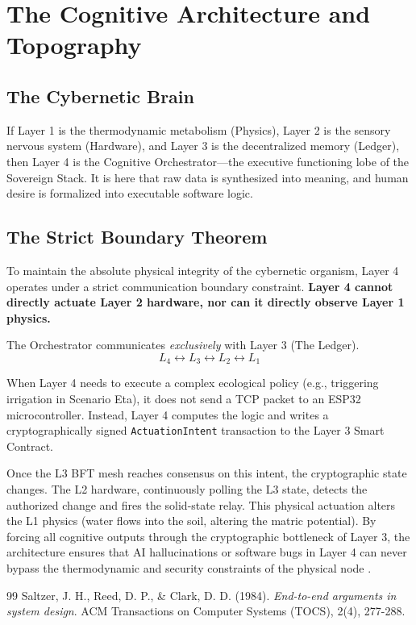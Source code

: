 \chapter{The Cognitive Architecture and Topography}

\section{The Cybernetic Brain}
If Layer 1 is the thermodynamic metabolism (Physics), Layer 2 is the sensory nervous system (Hardware), and Layer 3 is the decentralized memory (Ledger), then Layer 4 is the Cognitive Orchestrator—the executive functioning lobe of the Sovereign Stack. It is here that raw data is synthesized into meaning, and human desire is formalized into executable software logic.

\section{The Strict Boundary Theorem}
To maintain the absolute physical integrity of the cybernetic organism, Layer 4 operates under a strict communication boundary constraint. \textbf{Layer 4 cannot directly actuate Layer 2 hardware, nor can it directly observe Layer 1 physics.} 

The Orchestrator communicates \textit{exclusively} with Layer 3 (The Ledger). 
\begin{equation}
L_4 \leftrightarrow L_3 \leftrightarrow L_2 \leftrightarrow L_1
\end{equation}

When Layer 4 needs to execute a complex ecological policy (e.g., triggering irrigation in Scenario Eta), it does not send a TCP packet to an ESP32 microcontroller. Instead, Layer 4 computes the logic and writes a cryptographically signed \texttt{ActuationIntent} transaction to the Layer 3 Smart Contract. 

Once the L3 BFT mesh reaches consensus on this intent, the cryptographic state changes. The L2 hardware, continuously polling the L3 state, detects the authorized change and fires the solid-state relay. This physical actuation alters the L1 physics (water flows into the soil, altering the matric potential). By forcing all cognitive outputs through the cryptographic bottleneck of Layer 3, the architecture ensures that AI hallucinations or software bugs in Layer 4 can never bypass the thermodynamic and security constraints of the physical node \cite{saltzer1984end}.

\vspace{1cm}
\begin{thebibliography}{99}
Saltzer, J. H., Reed, D. P., \& Clark, D. D. (1984). \textit{End-to-end arguments in system design}. ACM Transactions on Computer Systems (TOCS), 2(4), 277-288.
\end{thebibliography}
